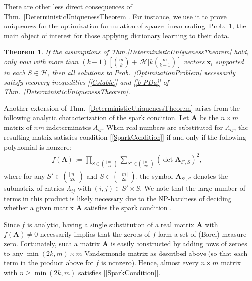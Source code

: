 \documentclass[9pt,twocolumn]{pnas-new}
\newtheorem{theorem}{Theorem}
\renewcommand{\eqref}[1]{\textnormal{[\ref{#1}]}}
\begin{document}
There are other less direct consequences of Thm.~\ref{DeterministicUniquenessTheorem}.  For instance, we use it to prove uniqueness for the optimization formulation of sparse linear coding, Prob.~\ref{SLCopt}, the main object of interest for those applying dictionary learning to their data.

\begin{theorem}\label{SLCopt}
If the assumptions of Thm.\ref{DeterministicUniquenessTheorem} hold, only now with more than $(k-1)\left[ {\bar m \choose k} + |\mathcal{H}|k{\bar m \choose k-1}\right]$ vectors $\mathbf{x}_i$ supported in each $S \in \mathcal{H}$, then all solutions to Prob.~\ref{OptimizationProblem} necessarily satisfy recovery inequalities \eqref{Cstable} and \eqref{b-PDa} of Thm.~\ref{DeterministicUniquenessTheorem}.
\end{theorem}

Another extension of Thm.~\ref{DeterministicUniquenessTheorem} arises from the following analytic characterization of the spark condition.  Let $\mathbf{A}$  be the $n \times m$ matrix of $nm$ indeterminates $A_{ij}$. When real numbers are substituted for $A_{ij}$, the resulting matrix satisfies condition \eqref{SparkCondition} if and only if the following polynomial is nonzero:
\begin{align*}
f(\mathbf{A}) := \prod_{S \in {[m] \choose 2k}} \sum_{S' \in {[n] \choose 2k}} (\det \mathbf{A}_{S',S})^2,
\end{align*}
%
where for any $S' \in {[n] \choose 2k}$ and $S \in {[m] \choose 2k}$, the symbol $\mathbf{A}_{S',S}$ denotes the submatrix of entries $A_{ij}$ with $(i,j) \in S' \times S$.   We note that the large number of terms in this product is likely necessary due to the NP-hardness of deciding whether a given matrix $\mathbf{A}$ satisfies the spark condition \cite{tillmann2014computational}.

Since $f$ is analytic, having a single substitution of a real matrix $\mathbf{A}$ with $f(\mathbf{A}) \neq 0$ necessarily implies that the zeroes of $f$ form a set of (Borel) measure zero. Fortunately, such a matrix $\mathbf{A}$ is easily constructed by adding rows of zeroes to any $\min(2k,m) \times m$ Vandermonde matrix as described above (so that each term in the product above for $f$ is nonzero). Hence, almost every $n \times m$ matrix with $n \geq \min(2k,m)$ satisfies \eqref{SparkCondition}.
\end{document}
